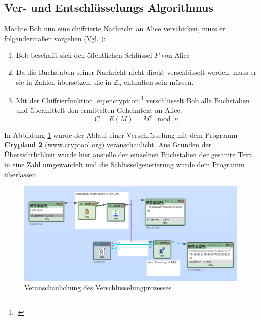 \documentclass{scrarticle} %
\begin{document}
    \subsection{Ver- und Entschlüsselungs Algorithmus}
            Möchte Bob nun eine chiffrierte Nachricht an Alice verschicken, muss er folgendermaßen vorgehen (Vgl. \cite[71]{watjen2008}):
            \begin{enumerate}
                \item Bob beschafft sich den öffentlichen Schlüssel $P$ von Alice
                \item Da die Buchstaben seiner Nachricht nicht direkt verschlüsselt werden, muss er sie in Zahlen übersetzen, die in $\mathbb{Z}_n$ enthalten sein müssen. %
                \item
                Mit der Chiffrierfunktion \ref{eq:encryption}\footcite[77]{ertel2003} verschlüsselt Bob alle Buchstaben und übermittelt den ermittelten Geheimtext an Alice.
                \begin{equation}
                    C = E(M) = M^{e}\mod{n} \label{eq:encryption}
                \end{equation}
            \end{enumerate}
            In Abbildung \ref{fig:encrypt} wurde der Ablauf einer Verschlüsselung mit dem Programm \textbf{Cryptool 2} (www.cryptool.org) veranschaulicht. Aus Gründen der Übersichtlichkeit wurde hier anstelle der einzelnen Buchstaben der gesamte Text in eine Zahl umgewandelt und die Schlüsselgenerierung wurde dem Programm überlassen.
            \begin{figure}
                \includegraphics[width=\linewidth]{content/cryptool_encrypt_e1.png}
                \caption{Veranschaulichung des Verschlüsselungprozesses\protect\footnotemark}
                \label{fig:encrypt}
            \end{figure}
\end{document}
